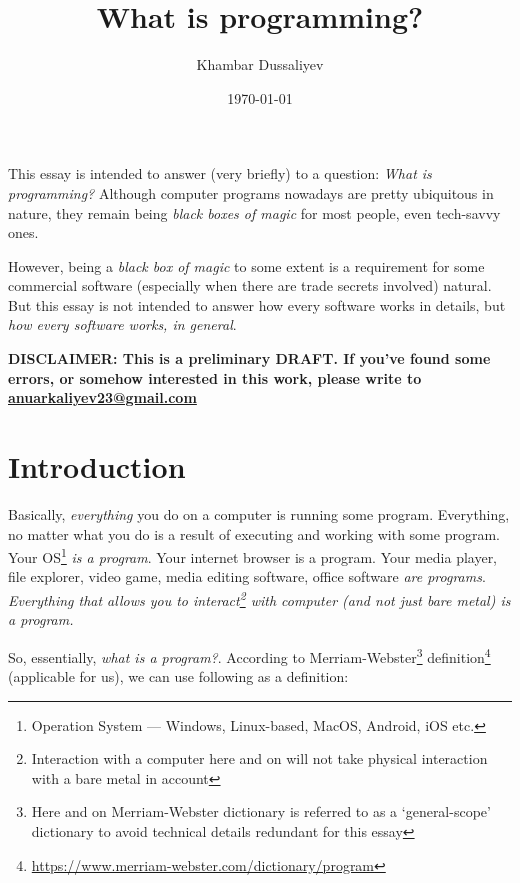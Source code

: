 \documentclass{report}
\title{What is programming?}
\author{Khambar Dussaliyev}
\date{\today}
\begin{document}
    \maketitle

    This essay is intended to answer (very briefly) to a question: \emph{What is programming?}
    Although computer programs nowadays are pretty ubiquitous in nature, they remain being \emph{black boxes of magic}
    for most people, even tech-savvy ones. \par
    
    However, being a \emph{black box of magic} to some extent is a requirement for some commercial software (especially when there are trade secrets involved) 
    natural. But this essay is not intended to answer how every software works in details, but \emph{how every software works, in general}. \par

    \textbf{DISCLAIMER: This is a preliminary DRAFT. If you've found some errors, or somehow interested in this work,
        please write to \href{mailto:anuarkaliyev23@gmail.com}{anuarkaliyev23@gmail.com}}

    \newpage

    \tableofcontents

    \chapter{Introduction}

        Basically, \emph{everything} you do on a computer is running some program. Everything, no matter what you do is a result of executing and working with
        some program. Your OS\footnote{Operation System --- Windows, Linux-based, MacOS, Android, iOS etc.} \emph{is a program}. Your internet browser is a program. 
        Your media player, file explorer, video game, media editing software, office software \emph{are programs}. 
        \emph{Everything that allows you to interact\footnote{Interaction with a computer here and on will not take physical interaction with a bare metal in account} 
        with computer (and not just bare metal) is a program.} \par
        
        So, essentially, \emph{what is a program?}. According to Merriam-Webster\footnote{Here and on Merriam-Webster dictionary is referred to as a `general-scope' dictionary to avoid technical details redundant for this essay} 
        definition\footnote{\href{https://www.merriam-webster.com/dictionary/program}{https://www.merriam-webster.com/dictionary/program}} 
        (applicable for us), we can use following as a definition: \par
        
\end{document}

